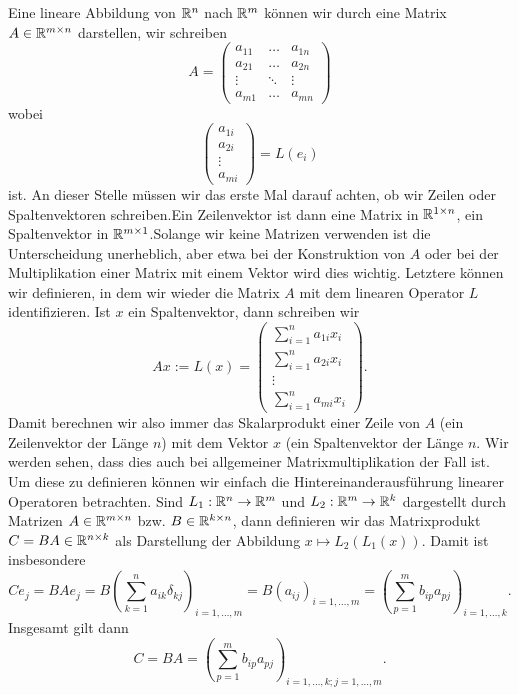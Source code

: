 Eine lineare Abbildung von \(\mathbb{R}^n\) nach \(\mathbb{R}^m\) können wir durch eine Matrix \(A \in \mathbb{R}^{m \times n}\) darstellen, wir schreiben
\begin{equation*}
 A = \left( \begin{array}{ccc} a_{11} &\ldots& a_{1n} \\ a_{21} &\ldots &a_ {2n} \\ \vdots &\ddots &\vdots \\ a_{m1} &\ldots& a_{mn} \end{array} \right)
\end{equation*}
wobei
\begin{equation*}
 \left( \begin{array}{c} a_{1i} \\ a_{2i}  \\ \vdots \\ a_{mi}  \end{array} \right) = L(e_i)
\end{equation*}
ist. An dieser Stelle müssen wir das erste Mal darauf achten, ob wir Zeilen  oder Spaltenvektoren schreiben.Ein Zeilenvektor ist dann eine Matrix in \(\mathbb{R}^{1 \times n}\), ein Spaltenvektor in \(\mathbb{R}^{m \times 1}\).Solange wir keine Matrizen verwenden ist die Unterscheidung unerheblich, aber etwa bei der Konstruktion von \(A\) oder bei der Multiplikation einer Matrix mit einem Vektor wird dies wichtig. Letztere können wir definieren, in dem wir wieder die Matrix \(A\) mit dem linearen Operator \(L\) identifizieren. Ist \(x\) ein Spaltenvektor, dann schreiben wir
\begin{equation*}
 A x := L(x) = \left( \begin{array}{c} \sum_{i=1}^n a_{1i} x_i \\ \sum_{i=1}^n a_{2i} x_i \\ \vdots \\ \sum_{i=1}^n a_{mi} x_i  \end{array} \right) .
\end{equation*}
Damit berechnen wir also immer das Skalarprodukt einer Zeile von \(A\) (ein Zeilenvektor der Länge \(n\)) mit dem Vektor \(x\) (ein Spaltenvektor der Länge \(n\). Wir werden sehen, dass dies auch bei allgemeiner Matrixmultiplikation der Fall ist. Um diese zu definieren können wir einfach die Hintereinanderausführung linearer Operatoren betrachten. Sind \(L_1: \mathbb{R}^n \rightarrow \mathbb{R}^m\) und  \(L_2: \mathbb{R}^m \rightarrow \mathbb{R}^k\) dargestellt durch Matrizen \(A \in \mathbb{R}^{m \times n}\) bzw. \(B \in \mathbb{R}^{k \times n}\), dann definieren wir das Matrixprodukt \(C = BA \in \mathbb{R}^{n \times k}\) als Darstellung der Abbildung \(x \mapsto L_2(L_1(x))\). Damit ist insbesondere
\begin{equation*}
 C e_j = BAe_j = B (\sum_{k=1}^n a_{ik} \delta_{kj})_{i=1,\ldots,m} = B (a_{ij})_{i=1,\ldots,m} = (\sum_{p=1}^m b_{ip} a_{pj})_{i=1,\ldots,k}.
\end{equation*}
Insgesamt gilt dann
\begin{equation*}
 C = BA =  (\sum_{p=1}^m b_{ip} a_{pj})_{i=1,\ldots,k; j=1,\ldots,m} .
\end{equation*}

